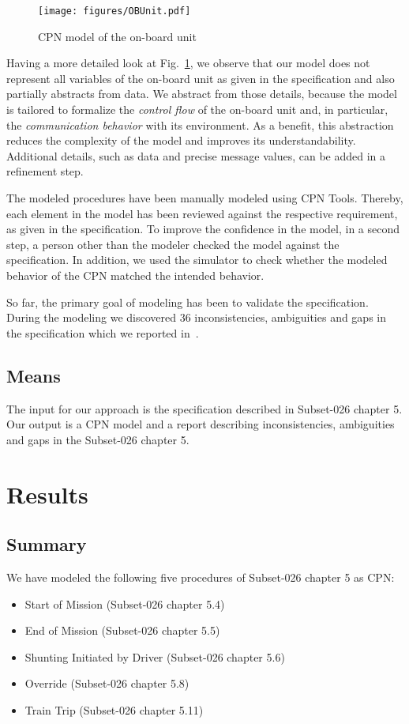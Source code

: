 \begin{figure}[tb]
	\centering
		\texttt{[image: figures/OBUnit.pdf]}
	\caption{CPN model of the on-board unit}
	\label{fig:OBUnit}
\end{figure}

Having a more detailed look at Fig.~\ref{fig:OBUnit}, we observe that our model does not represent all variables of the on-board unit as given in the specification and also partially abstracts from data. We abstract from those details, because the model is tailored to formalize the \textit{control flow} of the on-board unit and, in particular, the \textit{communication behavior} with its environment. As a benefit, this abstraction reduces the complexity of the model and improves its understandability. Additional details, such as data and precise message values, can be added in a refinement step.

The modeled procedures have been manually modeled using CPN Tools. Thereby, each element in the model has been reviewed against the respective requirement, as given in the specification. To improve the confidence in the model, in a second step, a person other than the modeler checked the model against the specification. In addition, we used the simulator to check whether the modeled behavior of the CPN matched the intended behavior.

So far, the primary goal of modeling has been to validate the specification. During the modeling we discovered 36 inconsistencies, ambiguities and gaps in the specification which we reported in~\cite{specfindings}. 


\subsection{Means}

The input for our approach is the specification described in Subset-026 chapter 5. Our output is a CPN model and a report describing inconsistencies, ambiguities and gaps in the Subset-026 chapter 5.


\section{Results}

\subsection{Summary}

We have modeled the following five procedures of Subset-026 chapter 5 as CPN:
\begin{itemize}
	\item Start of Mission (Subset-026 chapter 5.4)
	\item End of Mission (Subset-026 chapter 5.5)
	\item Shunting Initiated by Driver (Subset-026 chapter 5.6)
	\item Override (Subset-026 chapter 5.8)
	\item Train Trip (Subset-026 chapter 5.11)
\end{itemize}


